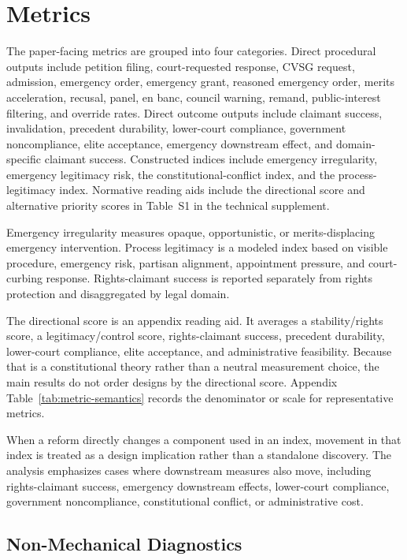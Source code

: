 \documentclass[
    journal=jlc,
    manuscript=research-article,
    year=2026,
  ]{cup-journal}
\begin{document}
\section{Metrics}

The paper-facing metrics are grouped into four categories. Direct procedural outputs include petition filing, court-requested response, CVSG request, admission, emergency order, emergency grant, reasoned emergency order, merits acceleration, recusal, panel, en banc, council warning, remand, public-interest filtering, and override rates. Direct outcome outputs include claimant success, invalidation, precedent durability, lower-court compliance, government noncompliance, elite acceptance, emergency downstream effect, and domain-specific claimant success. Constructed indices include emergency irregularity, emergency legitimacy risk, the constitutional-conflict index, and the process-legitimacy index. Normative reading aids include the directional score and alternative priority scores in Table~S1 in the technical supplement.

Emergency irregularity measures opaque, opportunistic, or merits-displacing emergency intervention. Process legitimacy is a modeled index based on visible procedure, emergency risk, partisan alignment, appointment pressure, and court-curbing response. Rights-claimant success is reported separately from rights protection and disaggregated by legal domain.

The directional score is an appendix reading aid. It averages a stability/rights score, a legitimacy/control score, rights-claimant success, precedent durability, lower-court compliance, elite acceptance, and administrative feasibility. Because that is a constitutional theory rather than a neutral measurement choice, the main results do not order designs by the directional score. Appendix Table~\ref{tab:metric-semantics} records the denominator or scale for representative metrics.

When a reform directly changes a component used in an index, movement in that index is treated as a design implication rather than a standalone discovery. The analysis emphasizes cases where downstream measures also move, including rights-claimant success, emergency downstream effects, lower-court compliance, government noncompliance, constitutional conflict, or administrative cost.

\subsection{Non-Mechanical Diagnostics}
\end{document}
